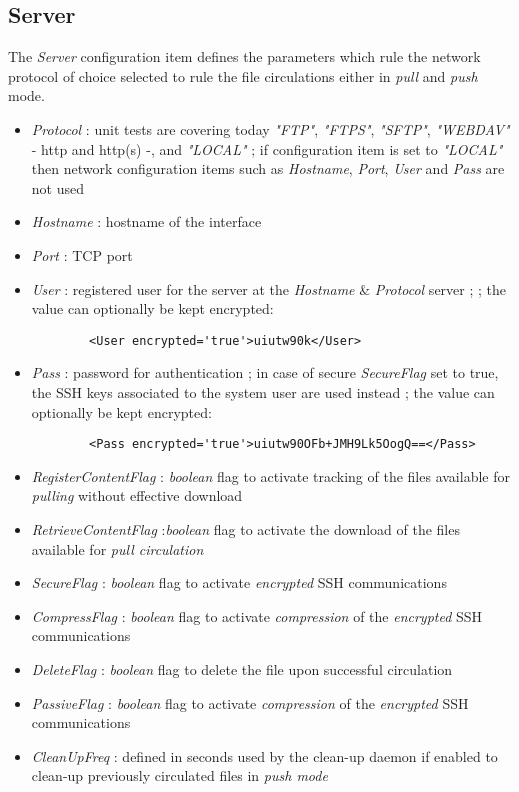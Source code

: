 \documentclass[dec_sum_main.tex]{subfiles}
\begin{document}
\subsection{Server}
The \textit{Server} configuration item defines the parameters which rule the network protocol of choice selected to rule the file circulations either in \textit{pull} and \textit{push} mode.
\par
\noindent
\begin{itemize}
	\item \textit{Protocol} : unit tests are covering today \textit{"FTP"}, \textit{"FTPS"}, \textit{"SFTP"}, \textit{"WEBDAV"} - http and http(s) -, and\textit{ "LOCAL"} ; if configuration item is set to \textit{"LOCAL"} then network configuration items such as \textit{Hostname}, \textit{Port}, \textit{User} and \textit{Pass} are not used   
	\label{Hostname}\item \textit{Hostname} : hostname of the interface
	\item \textit{Port} : TCP port
	\item \textit{User} : registered user for the server at the \textit{Hostname} \& \textit{Protocol} server ; ; the value can optionally be kept encrypted:
	\begin{Verbatim}
		<User encrypted='true'>uiutw90k</User>
	\end{Verbatim}
	\item \textit{Pass} : password for authentication ; in case of secure \textit{SecureFlag} set to true, the SSH keys associated to the system user are used instead ; the value can optionally be kept encrypted:
	\begin{Verbatim}
		<Pass encrypted='true'>uiutw90OFb+JMH9Lk5OogQ==</Pass>
	\end{Verbatim}
	\item \textit{RegisterContentFlag} : \textit{boolean} flag to activate tracking of the files available for \textit{pulling} without effective download
	\item \textit{RetrieveContentFlag} :\textit{boolean} flag to activate the download of the files available for \textit{pull circulation} 
	\item \textit{SecureFlag} : \textit{boolean} flag to activate \textit{encrypted} SSH communications
	\item \textit{CompressFlag} : \textit{boolean} flag to activate \textit{compression} of the \textit{encrypted} SSH communications
	\label{DeleteFlag}
	\item \textit{DeleteFlag} : \textit{boolean} flag to delete the file upon successful circulation
	\item \textit{PassiveFlag} : \textit{boolean} flag to activate \textit{compression} of the \textit{encrypted} SSH communications
	\item \textit{CleanUpFreq} : defined in seconds used by the clean-up daemon if enabled to clean-up previously circulated files in \textit{push mode}	
\end{itemize}
\end{document}
